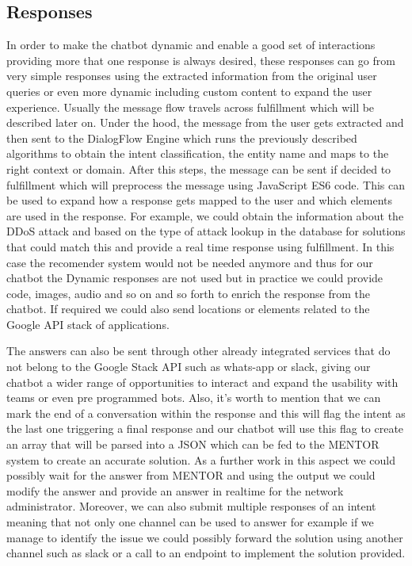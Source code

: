 \subsection{Responses}
In order to make the chatbot dynamic and enable a good set of interactions providing more that one response is always desired, these responses can go from very simple responses using the extracted information from the original user queries or even more dynamic including custom content to expand the user experience. Usually the message flow travels across fulfillment which will be described later on. Under the hood, the message from the user gets extracted and then sent to the DialogFlow Engine which runs the previously described algorithms to obtain the intent classification, the entity name and maps to the right context or domain. After this steps, the message can be sent if decided to fulfillment which will preprocess the message using JavaScript ES6 code. This can be used to expand how a response gets mapped to the user and which elements are used in the response. For example, we could obtain the information about the DDoS attack and based on the type of attack lookup in the database for solutions that could match this and provide a real time response using fulfillment. In this case the recomender system would not be needed anymore and thus for our chatbot the Dynamic responses are not used but in practice we could provide code, images, audio and so on and so forth to enrich the response from the chatbot. If required we could also send locations or elements related to the Google API stack of applications.

The answers can also be sent through other already integrated services that do not belong to the Google Stack API such as whats-app or slack, giving our chatbot a wider range of opportunities to interact and expand the usability with teams or even pre programmed bots. Also, it's worth to mention that we can mark the end of a conversation within the response and this will flag the intent as the last one triggering a final response and our chatbot will use this flag to create an array that will be parsed into a JSON which can be fed to the MENTOR system to create an accurate solution. As a further work in this aspect we could possibly wait for the answer from MENTOR and using the output we could modify the answer and provide an answer in realtime for the network administrator. Moreover, we can also submit multiple responses of an intent meaning that not only one channel can be used to answer for example if we manage to identify the issue we could possibly forward the solution using another channel such as slack or a call to an endpoint to implement the solution provided.


